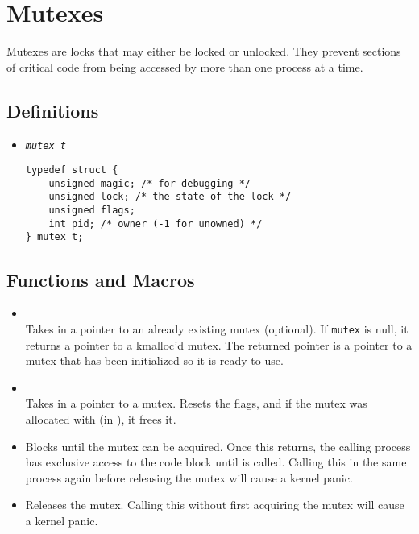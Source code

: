 \documentclass[a4paper]{article}
\begin{document}
\section{Mutexes}

Mutexes are locks that may either be locked or unlocked. They prevent sections of
critical code from being accessed by more than one process at a time.

\subsection{Definitions}
\begin{itemize}

\item \texttt{\textit{mutex\_t}} 
\begin{lstlisting}
typedef struct {
	unsigned magic; /* for debugging */
	unsigned lock; /* the state of the lock */
	unsigned flags;
	int pid; /* owner (-1 for unowned) */
} mutex_t;
\end{lstlisting}

\end{itemize}

\subsection{Functions and Macros}
\begin{itemize}
\item {} \\
Takes in a pointer to an already existing mutex (optional). If \texttt{mutex} is 
null, it returns a pointer to a kmalloc'd mutex. The returned pointer
is a pointer to a mutex that has been initialized so it is ready to use.

\item {} \\
Takes in a pointer to a mutex. Resets the flags, and if the mutex was allocated
with  (in ), it frees it.
\item {} 
Blocks until the mutex can be acquired. Once this returns,
the calling process has exclusive access to the code block until  is called.
Calling this in the same process again before releasing the mutex will cause a kernel panic.
\item {} 
Releases the mutex. Calling this without first acquiring the mutex will cause a kernel panic.
\end{itemize}
\end{document}
